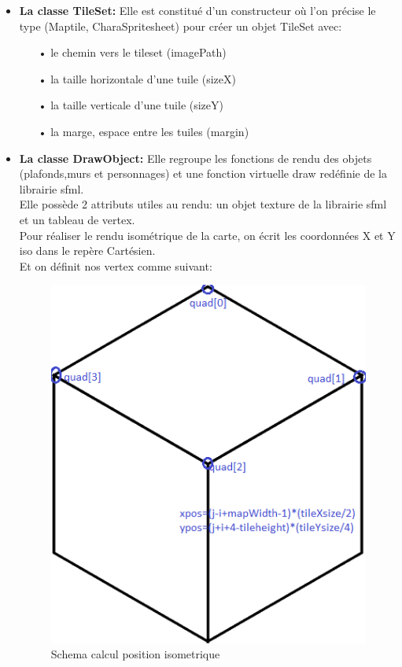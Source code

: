 \begin{itemize}
    \item \textbf{La classe TileSet:} Elle est constitué d'un constructeur où l'on précise le type (Maptile, CharaSpritesheet) pour créer un objet TileSet avec:
    \begin{itemize}
         \item[•]  le chemin vers le tileset (imagePath)
         \item[•]  la taille horizontale d'une tuile (sizeX)
         \item[•]  la taille verticale d'une tuile (sizeY)
         \item[•]  la marge, espace entre les tuiles (margin)
         \\
    \end{itemize}     
    \item \textbf{La classe DrawObject:} Elle regroupe les fonctions de rendu des objets (plafonds,murs et personnages)
    et une fonction virtuelle draw redéfinie de la librairie sfml.
    \\
    Elle possède 2 attributs utiles au rendu: un objet texture de la librairie sfml et un tableau de vertex.
    \\
    Pour réaliser le rendu isométrique de la carte, on écrit les coordonnées X et Y iso dans le repère Cartésien. 
    \\Et on définit nos vertex comme suivant:
    
\begin{figure}[H]
\includegraphics[]{images/carre_iso.png}
\centering
\caption{Schema calcul position isometrique}
\label{fig:img3}
\end{figure}


\end{itemize}
